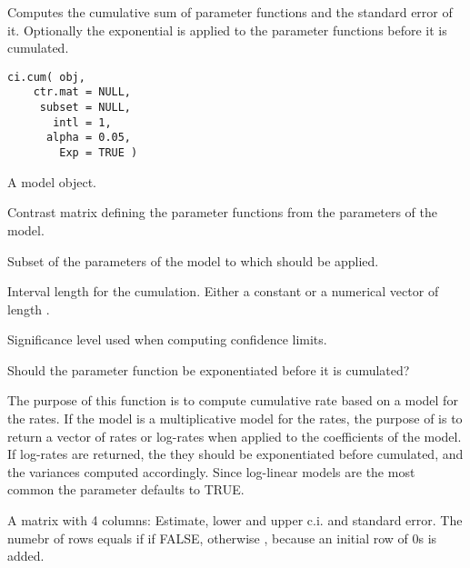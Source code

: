 \begin{Description}\relax
Computes the cumulative sum of parameter functions and the
standard error of it. Optionally the exponential is applied to the
parameter functions before it is cumulated.
\end{Description}
\begin{Usage}
\begin{verbatim}
ci.cum( obj,
    ctr.mat = NULL,
     subset = NULL,
       intl = 1,
      alpha = 0.05,
        Exp = TRUE )
\end{verbatim}
\end{Usage}
\begin{Arguments}
\begin{ldescription}
\item[\code{obj}] A model object. 
\item[\code{ctr.mat}] Contrast matrix defining the parameter functions from
the parameters of the model. 
\item[\code{subset}] Subset of the parameters of the model to which
 should be applied. 
\item[\code{intl}] Interval length for the cumulation. Either a constant or
a numerical vector of length . 
\item[\code{alpha}] Significance level used when computing confidence limits. 
\item[\code{Exp}] Should the parameter function be exponentiated before it is
cumulated? 
\end{ldescription}
\end{Arguments}
\begin{Details}\relax
The purpose of this function is to compute cumulative rate based on a
model for the rates. If the model is a multiplicative model for the
rates, the purpose of  is to return a vector of rates or
log-rates when applied to the coefficients of the model. If log-rates
are returned, the they should be exponentiated before cumulated, and
the variances computed accordingly. Since log-linear models are the most
common the  parameter defaults to TRUE.
\end{Details}
\begin{Value}
A matrix with 4 columns: Estimate, lower and upper c.i. and standard
error. The numebr of rows equals  if  if
FALSE, otherwise , because an initial row of 0s
is added.
\end{Value}
